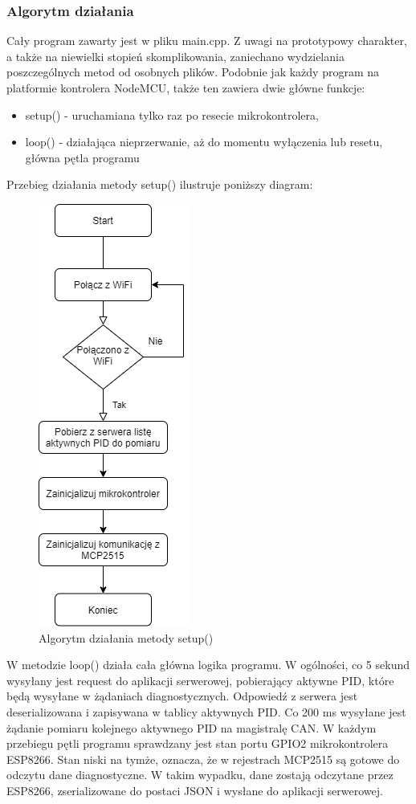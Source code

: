 \documentclass[10pt,a4paper]{scrartcl}
\begin{document}
		\subsubsection{Algorytm działania}
		Cały program zawarty jest w pliku main.cpp. Z uwagi na prototypowy charakter, a także na niewielki stopień skomplikowania, zaniechano wydzielania poszczególnych metod od osobnych plików. Podobnie jak każdy program na platformie kontrolera NodeMCU, także ten zawiera dwie główne funkcje:
		\begin{itemize}
			\item setup() - uruchamiana tylko raz po resecie mikrokontrolera,
			\item loop() - działająca nieprzerwanie, aż do momentu wyłączenia lub resetu, główna pętla programu
		\end{itemize}
		Przebieg działania metody setup() ilustruje poniższy diagram:
		\begin{figure}[H]
			\centering
			\includegraphics[width=0.2\linewidth]{loop_algorymt}
			\caption[setup()- algorytm działania]{Algorytm działania metody setup()}
			\label{fig:loopalgorymt}
		\end{figure}
		W metodzie loop() działa cała główna logika programu. W ogólności, co 5 sekund wysyłany jest request do aplikacji serwerowej, pobierający aktywne PID, które będą wysyłane w żądaniach diagnostycznych. Odpowiedź z serwera jest deserializowana i zapisywana w tablicy aktywnych PID.
		Co 200 ms wysyłane jest żądanie pomiaru kolejnego aktywnego PID na magistralę CAN. W każdym przebiegu pętli programu sprawdzany jest stan portu GPIO2 mikrokontrolera ESP8266. Stan niski na tymże, oznacza, że w rejestrach MCP2515 są gotowe do odczytu dane diagnostyczne. W takim wypadku, dane zostają odczytane przez ESP8266, zserializowane do postaci JSON i wysłane do aplikacji serwerowej.
\end{document}
